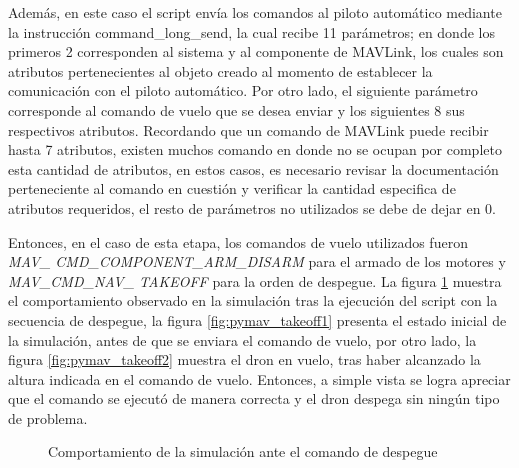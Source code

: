 Además, en este caso el script envía los comandos al piloto automático mediante la instrucción command\_long\_send, la cual recibe 11 parámetros; en donde los primeros 2 corresponden al sistema y al componente de MAVLink, los cuales son atributos pertenecientes al objeto creado al momento de establecer la comunicación con el piloto automático. Por otro lado, el siguiente parámetro corresponde al comando de vuelo que se desea enviar y los siguientes 8 sus respectivos atributos. Recordando que un comando de MAVLink puede recibir hasta 7 atributos, existen muchos comando en donde no se ocupan por completo esta cantidad de atributos, en estos casos, es necesario revisar la documentación perteneciente al comando en cuestión y verificar la cantidad especifica de atributos requeridos, el resto de parámetros no utilizados se debe de dejar en 0.

Entonces, en el caso de esta etapa, los comandos de vuelo utilizados fueron \textit{MAV\_ CMD\_COMPONENT\_ARM\_DISARM} para el armado de los motores y \textit{MAV\_CMD\_NAV\_ TAKEOFF} para la orden de despegue. La figura \ref{fig:pymav_takeoff} muestra el comportamiento observado en la simulación tras la ejecución del script con la secuencia de despegue, la figura \ref{fig:pymav_takeoff1} presenta el estado inicial de la simulación, antes de que se enviara el comando de vuelo, por otro lado, la figura \ref{fig:pymav_takeoff2} muestra el dron en vuelo, tras haber alcanzado la altura indicada en el comando de vuelo. Entonces, a simple vista se logra apreciar que el comando se ejecutó de manera correcta y el dron despega sin ningún tipo de problema.  

\begin{figure}[ht]
    \centering
    \hfill
    \caption{Comportamiento de la simulación ante el comando de despegue}
    \label{fig:pymav_takeoff}
\end{figure}


